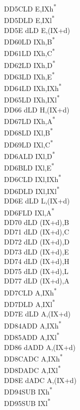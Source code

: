 \documentclass[oneside,a4paper]{book}
\begin{document}
\begin{multicols}{3}
{\begin{tabbing}
DD5C\>LD E,IXh\textsuperscript{*}\\
DD5D\>LD E,IXl\textsuperscript{*}\\
DD5E d\>LD E,(IX+d)\\
DD60\>LD IXh,B\textsuperscript{*}\\
DD61\>LD IXh,C\textsuperscript{*}\\
DD62\>LD IXh,D\textsuperscript{*}\\
DD63\>LD IXh,E\textsuperscript{*}\\
DD64\>LD IXh,IXh\textsuperscript{*}\\
DD65\>LD IXh,IXl\textsuperscript{*}\\
DD66 d\>LD H,(IX+d)\\
DD67\>LD IXh,A\textsuperscript{*}\\
DD68\>LD IXl,B\textsuperscript{*}\\
DD69\>LD IXl,C\textsuperscript{*}\\
DD6A\>LD IXl,D\textsuperscript{*}\\
DD6B\>LD IXl,E\textsuperscript{*}\\
DD6C\>LD IXl,IXh\textsuperscript{*}\\
DD6D\>LD IXl,IXl\textsuperscript{*}\\
DD6E d\>LD L,(IX+d)\\
DD6F\>LD IXl,A\textsuperscript{*}\\
DD70 d\>LD (IX+d),B\\
DD71 d\>LD (IX+d),C\\
DD72 d\>LD (IX+d),D\\
DD73 d\>LD (IX+d),E\\
DD74 d\>LD (IX+d),H\\
DD75 d\>LD (IX+d),L\\
DD77 d\>LD (IX+d),A\\
DD7C\>LD A,IXh\textsuperscript{*}\\
DD7D\>LD A,IXl\textsuperscript{*}\\
DD7E d\>LD A,(IX+d)\\
DD84\>ADD A,IXh\textsuperscript{*}\\
DD85\>ADD A,IXl\textsuperscript{*}\\
DD86 d\>ADD A,(IX+d)\\
DD8C\>ADC A,IXh\textsuperscript{*}\\
DD8D\>ADC A,IXl\textsuperscript{*}\\
DD8E d\>ADC A,(IX+d)\\
DD94\>SUB IXh\textsuperscript{*}\\
DD95\>SUB IXl\textsuperscript{*}\\

\end{tabbing}}
\end{multicols}
\end{document}
